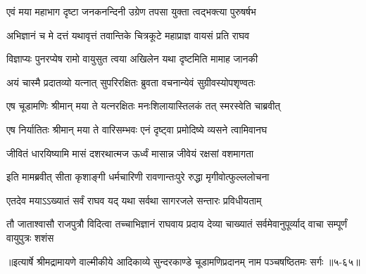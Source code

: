 \twolineshloka
{एवं मया महाभाग दृष्टा जनकनन्दिनी}
{उग्रेण तपसा युक्ता त्वद्भक्त्या पुरुषर्षभ} %

\twolineshloka
{अभिज्ञानं च मे दत्तं यथावृत्तं तवान्तिके}
{चित्रकूटे महाप्राज्ञ वायसं प्रति राघव} %

\twolineshloka
{विज्ञाप्यः पुनरप्येष रामो वायुसुत त्वया}
{अखिलेन यथा दृष्टमिति मामाह जानकी} %

\twolineshloka
{अयं चास्मै प्रदातव्यो यत्नात् सुपरिरक्षितः}
{ब्रुवता वचनान्येवं सुग्रीवस्योपशृण्वतः} %

\twolineshloka
{एष चूडामणिः श्रीमान् मया ते यत्नरक्षितः}
{मनःशिलायास्तिलकं तत् स्मरस्वेति चाब्रवीत्} %

\twolineshloka
{एष निर्यातितः श्रीमान् मया ते वारिसम्भवः}
{एनं दृष्ट्वा प्रमोदिष्ये व्यसने त्वामिवानघ} %

\twolineshloka
{जीवितं धारयिष्यामि मासं दशरथात्मज}
{ऊर्ध्वं मासान्न जीवेयं रक्षसां वशमागता} %

\twolineshloka
{इति मामब्रवीत् सीता कृशाङ्गी धर्मचारिणी}
{रावणान्तःपुरे रुद्धा मृगीवोत्फुल्ललोचना} %

\twolineshloka
{एतदेव मयाऽऽख्यातं सर्वं राघव यद् यथा}
{सर्वथा सागरजले सन्तारः प्रविधीयताम्} %

\twolineshloka
{तौ जाताश्वासौ राजपुत्रौ विदित्वा तच्चाभिज्ञानं राघवाय प्रदाय}
{देव्या चाख्यातं सर्वमेवानुपूर्व्याद् वाचा सम्पूर्णं वायुपुत्रः शशंस} %


॥इत्यार्षे श्रीमद्रामायणे वाल्मीकीये आदिकाव्ये सुन्दरकाण्डे चूडामणिप्रदानम् नाम पञ्चषष्ठितमः सर्गः ॥५-६५॥
